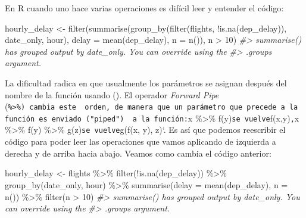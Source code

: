 \documentclass[
]{book}
\newenvironment{Shaded}{\begin{snugshade}}{\end{snugshade}}
\newcommand{\AttributeTok}[1]{\textcolor[rgb]{0.77,0.63,0.00}{#1}}
\newcommand{\CommentTok}[1]{\textcolor[rgb]{0.56,0.35,0.01}{\textit{#1}}}
\newcommand{\DecValTok}[1]{\textcolor[rgb]{0.00,0.00,0.81}{#1}}
\newcommand{\FunctionTok}[1]{\textcolor[rgb]{0.00,0.00,0.00}{#1}}
\newcommand{\NormalTok}[1]{#1}
\newcommand{\OtherTok}[1]{\textcolor[rgb]{0.56,0.35,0.01}{#1}}
\newcommand{\SpecialCharTok}[1]{\textcolor[rgb]{0.00,0.00,0.00}{#1}}
\begin{document}
En R cuando uno hace varias operaciones es difícil leer y entender el código:

\begin{Shaded}
\begin{Highlighting}[]
\NormalTok{hourly\_delay }\OtherTok{\textless{}{-}} \FunctionTok{filter}\NormalTok{(}\FunctionTok{summarise}\NormalTok{(}\FunctionTok{group\_by}\NormalTok{(}\FunctionTok{filter}\NormalTok{(flights, }\SpecialCharTok{!}\FunctionTok{is.na}\NormalTok{(dep\_delay)), }
\NormalTok{  date\_only, hour), }\AttributeTok{delay =} \FunctionTok{mean}\NormalTok{(dep\_delay), }\AttributeTok{n =} \FunctionTok{n}\NormalTok{()), n }\SpecialCharTok{\textgreater{}} \DecValTok{10}\NormalTok{)}
\CommentTok{\#\textgreater{} \textasciigrave{}summarise()\textasciigrave{} has grouped output by \textquotesingle{}date\_only\textquotesingle{}. You can override using the}
\CommentTok{\#\textgreater{} \textasciigrave{}.groups\textasciigrave{} argument.}
\end{Highlighting}
\end{Shaded}

La dificultad radica en que usualmente los parámetros se asignan después del
nombre de la función usando (). El operador \emph{Forward Pipe} (\texttt{\%\textgreater{}\%)\ cambia\ este\ \ orden,\ de\ manera\ que\ un\ parámetro\ que\ precede\ a\ la\ función\ es\ enviado\ ("piped")\ \ a\ la\ función:}x \%\textgreater\% f(y)\texttt{se\ vuelve}f(x,y)\texttt{,}x \%\textgreater\% f(y) \%\textgreater\% g(z)\texttt{se\ vuelve}g(f(x, y), z)`. Es así que podemos reescribir el código para poder leer las
operaciones que vamos aplicando de izquierda a derecha
y de arriba hacia abajo.
Veamos como cambia el código anterior:

\begin{Shaded}
\begin{Highlighting}[]
\NormalTok{hourly\_delay }\OtherTok{\textless{}{-}}\NormalTok{ flights }\SpecialCharTok{\%\textgreater{}\%}
  \FunctionTok{filter}\NormalTok{(}\SpecialCharTok{!}\FunctionTok{is.na}\NormalTok{(dep\_delay)) }\SpecialCharTok{\%\textgreater{}\%}
  \FunctionTok{group\_by}\NormalTok{(date\_only, hour) }\SpecialCharTok{\%\textgreater{}\%}
  \FunctionTok{summarise}\NormalTok{(}\AttributeTok{delay =} \FunctionTok{mean}\NormalTok{(dep\_delay), }\AttributeTok{n =} \FunctionTok{n}\NormalTok{()) }\SpecialCharTok{\%\textgreater{}\%}
  \FunctionTok{filter}\NormalTok{(n }\SpecialCharTok{\textgreater{}} \DecValTok{10}\NormalTok{)}
\CommentTok{\#\textgreater{} \textasciigrave{}summarise()\textasciigrave{} has grouped output by \textquotesingle{}date\_only\textquotesingle{}. You can override using the}
\CommentTok{\#\textgreater{} \textasciigrave{}.groups\textasciigrave{} argument.}
\end{Highlighting}
\end{Shaded}
\end{document}
